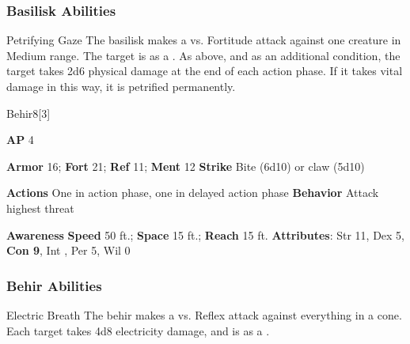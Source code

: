 \subsubsection{Basilisk Abilities}

\begin{ability}{Petrifying Gaze}
The basilisk makes a  vs. Fortitude attack against one creature in Medium range.
\hit The target is  as a .
\crit As above, and as an additional condition, the target takes 2d6 physical damage at the end of each action phase.
If it takes vital damage in this way, it is petrified permanently.
\end{ability}

\begin{monsection}{Behir}{8}[3]
\vspace{-1em}\vspace{-1em}
\begin{spellcontent}
\begin{spelltargetinginfo}
{\textbf{AP} 4}

\pari \textbf{Armor} 16;
\textbf{Fort} 21;
\textbf{Ref} 11;
\textbf{Ment} 12
\pari \textbf{Strike} Bite  (6d10) or claw  (5d10)


\pari \textbf{Actions} One in action phase, one in delayed action phase
\pari \textbf{Behavior} Attack highest threat
\end{spelltargetinginfo}
\end{spellcontent}

\begin{monsterfooter}
\pari \textbf{Awareness} 
\pari \textbf{Speed} 50 ft.;
\textbf{Space} 15 ft.;
\textbf{Reach} 15 ft.
\pari \textbf{Attributes}:
Str 11,
Dex 5,
\textbf{Con 9},
Int ,
Per 5,
Wil 0
\end{monsterfooter}
\end{monsection}


\subsubsection{Behir Abilities}

\begin{ability}{Electric Breath}
The behir makes a  vs. Reflex attack against everything in a \areamed cone.
\hit Each target takes 4d8 electricity damage, and is  as a .
\end{ability}

